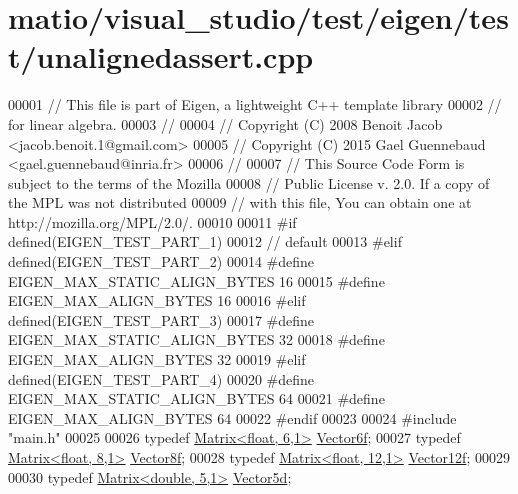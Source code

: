 \hypertarget{matio_2visual__studio_2test_2eigen_2test_2unalignedassert_8cpp_source}{}\section{matio/visual\+\_\+studio/test/eigen/test/unalignedassert.cpp}
\label{matio_2visual__studio_2test_2eigen_2test_2unalignedassert_8cpp_source}

\begin{DoxyCode}
00001 \textcolor{comment}{// This file is part of Eigen, a lightweight C++ template library}
00002 \textcolor{comment}{// for linear algebra.}
00003 \textcolor{comment}{//}
00004 \textcolor{comment}{// Copyright (C) 2008 Benoit Jacob <jacob.benoit.1@gmail.com>}
00005 \textcolor{comment}{// Copyright (C) 2015 Gael Guennebaud <gael.guennebaud@inria.fr>}
00006 \textcolor{comment}{//}
00007 \textcolor{comment}{// This Source Code Form is subject to the terms of the Mozilla}
00008 \textcolor{comment}{// Public License v. 2.0. If a copy of the MPL was not distributed}
00009 \textcolor{comment}{// with this file, You can obtain one at http://mozilla.org/MPL/2.0/.}
00010 
00011 \textcolor{preprocessor}{#if defined(EIGEN\_TEST\_PART\_1)}
00012   \textcolor{comment}{// default}
00013 \textcolor{preprocessor}{#elif defined(EIGEN\_TEST\_PART\_2)}
00014 \textcolor{preprocessor}{  #define EIGEN\_MAX\_STATIC\_ALIGN\_BYTES 16}
00015 \textcolor{preprocessor}{  #define EIGEN\_MAX\_ALIGN\_BYTES 16}
00016 \textcolor{preprocessor}{#elif defined(EIGEN\_TEST\_PART\_3)}
00017 \textcolor{preprocessor}{  #define EIGEN\_MAX\_STATIC\_ALIGN\_BYTES 32}
00018 \textcolor{preprocessor}{  #define EIGEN\_MAX\_ALIGN\_BYTES 32}
00019 \textcolor{preprocessor}{#elif defined(EIGEN\_TEST\_PART\_4)}
00020 \textcolor{preprocessor}{  #define EIGEN\_MAX\_STATIC\_ALIGN\_BYTES 64}
00021 \textcolor{preprocessor}{  #define EIGEN\_MAX\_ALIGN\_BYTES 64}
00022 \textcolor{preprocessor}{#endif}
00023 
00024 \textcolor{preprocessor}{#include "main.h"}
00025 
00026 \textcolor{keyword}{typedef} \hyperlink{group___core___module_class_eigen_1_1_matrix}{Matrix<float,  6,1>} \hyperlink{group___core___module_class_eigen_1_1_matrix}{Vector6f};
00027 \textcolor{keyword}{typedef} \hyperlink{group___core___module}{Matrix<float,  8,1>} \hyperlink{group___core___module}{Vector8f};
00028 \textcolor{keyword}{typedef} \hyperlink{group___core___module_class_eigen_1_1_matrix}{Matrix<float, 12,1>} \hyperlink{group___core___module_class_eigen_1_1_matrix}{Vector12f};
00029 
00030 \textcolor{keyword}{typedef} \hyperlink{group___core___module_class_eigen_1_1_matrix}{Matrix<double, 5,1>} \hyperlink{group___core___module_class_eigen_1_1_matrix}{Vector5d};

\end{DoxyCode}
